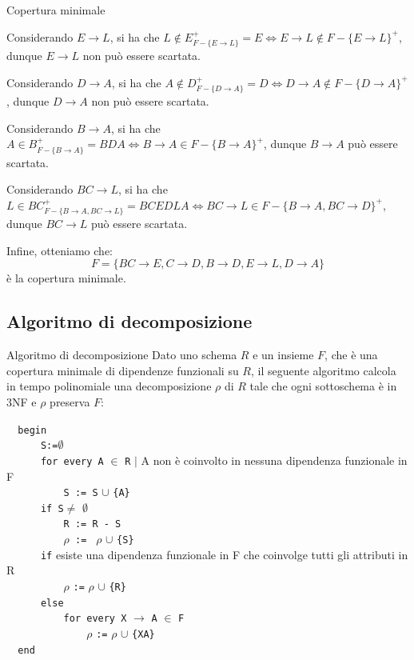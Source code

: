 \begin{Example}{Copertura minimale}{}
\begin{enumerate}
    Considerando $E\to L$, si ha che $L\notin E^+_{F-\{E\to L\}} = E \iff  E\to L\notin F-\{E\to L\}^+$, dunque $E\to L$ non può essere scartata.
    
    Considerando $D\to A$, si ha che $A\notin D^+_{F-\{D\to A\}} = D \iff  D\to A\notin F-\{D\to A\}^+$, dunque $D\to A$ non può essere scartata.
    
    Considerando $B\to A$, si ha che $A\in  B^+_{F-\{B\to A\}} = BDA \iff  B\to A\in F-\{B\to A\}^+$, dunque $B\to A$ può essere scartata.
    
    Considerando $BC\to L$, si ha che $L\in  BC^+_{F-\{B\to A,BC\to L\}} = BCEDLA \iff BC\to L\in F-\{B\to A, BC\to D\}^+$, dunque $BC\to L$ può essere scartata.
    \end{enumerate}
    Infine, otteniamo che:
    \begin{equation*}
        F = \{BC\to E, C\to D, B\to D, E\to L, D\to A\}
    \end{equation*}
    è la copertura minimale.
\end{Example}

\subsection{Algoritmo di decomposizione}

\begin{Algoritmo}{Algoritmo di decomposizione}{}
    Dato uno schema $R$ e un insieme $F$, che è una copertura minimale di dipendenze funzionali su $R$, il seguente algoritmo calcola in tempo polinomiale una decomposizione $\rho$ di $R$ tale che ogni sottoschema è in 3NF e $\rho$ preserva $F$:

    \verb|  begin|\\
    \verb|      S:=|$\emptyset$\\
    \verb|      for every A| $\in$ \verb|R| $|$ A non è coinvolto in nessuna dipendenza funzionale in F\\
    \verb|          S := S| $\cup$ \verb|{A}|\\
    \verb|      if S|$ \neq$ $\emptyset$\\
    \verb|          R := R - S|\\
    \verb|          |$\rho$\verb| := | $\rho$ $\cup$ \verb|{S}|\\
    \verb|      if| esiste una dipendenza funzionale in F che coinvolge tutti gli attributi in R\\
    \verb|          |$\rho$ \verb|:=| $\rho$ $\cup$ \verb|{R}|\\
    \verb|      else|\\
    \verb|          for every X| $\to$ \verb|A| $\in$ \verb|F|\\
    \verb|              |$\rho$ \verb|:=| $\rho$ $\cup$ \verb|{XA}|\\
    \verb|  end|
\end{Algoritmo}

